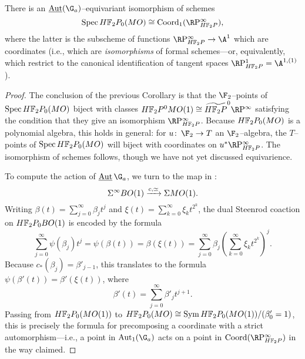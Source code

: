 \begin{corollary}
There is an $\InternalAut(\G_a)$--equivariant isomorphism of schemes \[\Spec \HFtwo P_0(MO) \cong \Coord_1(\RP^\infty_{\HFtwo P}),\] where the latter is the subscheme of functions $\RP^\infty_{\HFtwo P} \to \A^1$ which are coordinates (i.e., which are \emph{isomorphisms} of formal schemes---or, equivalently, which restrict to the canonical identification of tangent spaces $\RP^1_{\HFtwo P} = \A^{1,(1)}$).
\end{corollary}
\begin{proof}
The conclusion of the previous Corollary is that the $\F_2$--points of $\Spec \HFtwo P_0(MO)$ biject with classes $\HFtwo P^0 MO(1) \cong \widetilde{\HFtwo P}^0 \RP^\infty$ satisfying the condition that they give an isomorphism $\RP^\infty_{\HFtwo P}$.  Because $\HFtwo P_0(MO)$ is a polynomial algebra, this holds in general: for $u\co \F_2 \to T$ an $\F_2$--algebra, the $T$--points of $\Spec \HFtwo P_0(MO)$ will biject with coordinates on $u^* \RP^\infty_{\HFtwo P}$.  The isomorphism of schemes follows, though we have not yet discussed equivarience.

To compute the action of $\InternalAut \G_a$, we turn to the map in : \[\Sigma^\infty BO(1) \xrightarrow{c, \simeq} \Sigma MO(1).\]  Writing $\beta(t) = \sum_{j=0}^\infty \beta_j t^j$ and $\xi(t) = \sum_{k=0}^\infty \xi_k t^{2^k}$, the dual Steenrod coaction on $\HFtwo P_0 BO(1)$ is encoded by the formula \[\sum_{j=0}^\infty \psi(\beta_j) t^j = \psi(\beta(t)) = \beta(\xi(t)) = \sum_{j=0}^\infty \beta_j \left(\sum_{k=0}^\infty \xi_k t^{2^k} \right)^j.\]  Because $c_*(\beta_j) = \beta'_{j-1}$, this translates to the formula $\psi(\beta'(t)) = \beta'(\xi(t))$, where \[\beta'(t) = \sum_{j=0}^\infty \beta'_j t^{j+1}.\]  Passing from $\HFtwo P_0(MO(1))$ to $\HFtwo P_0(MO) \cong \Sym \HFtwo P_0(MO(1)) / (\beta'_0 = 1)$, this is precisely the formula for precomposing a coordinate with a strict automorphism---i.e., a point in $\Aut_1(\G_a)$ acts on a point in $\Coord(\RP^\infty_{\HFtwo P})$ in the way claimed.
\end{proof}

